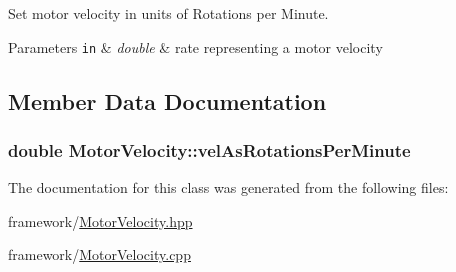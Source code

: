 Set motor velocity in units of Rotations per Minute. 


\begin{DoxyParams}[1]{Parameters}
\mbox{\tt in}  & {\em double} & rate representing a motor velocity \\
\hline
\end{DoxyParams}


\subsection{Member Data Documentation}
\hypertarget{classMotorVelocity_a1814d196cb74a2a0c1df5ce494714aea}{
\subsubsection[{vel\-As\-Rotations\-Per\-Minute}]{\setlength{\rightskip}{0pt plus 5cm}double Motor\-Velocity\-::vel\-As\-Rotations\-Per\-Minute\hspace{0.3cm}{\ttfamily [private]}}}\label{classMotorVelocity_a1814d196cb74a2a0c1df5ce494714aea}


The documentation for this class was generated from the following files\-:\begin{DoxyCompactItemize}
\item 
framework/\hyperlink{MotorVelocity_8hpp}{Motor\-Velocity.\-hpp}\item 
framework/\hyperlink{MotorVelocity_8cpp}{Motor\-Velocity.\-cpp}\end{DoxyCompactItemize}

